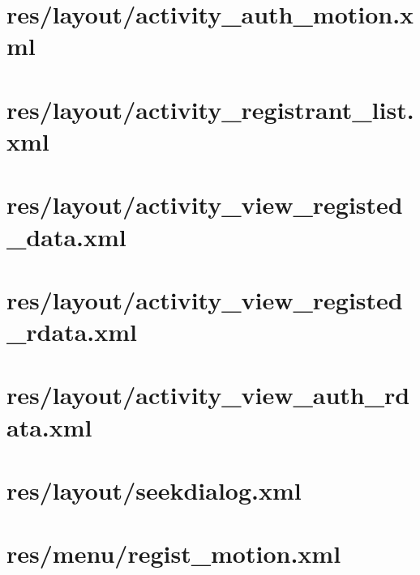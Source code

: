 \documentclass[12pt]{jreport}
\renewcommand{\slash}{/}
\begin{document}
    \section{res\slash layout\slash activity\_auth\_motion.xml}
    

    \section{res\slash layout\slash activity\_registrant\_list.xml}
    

    \section{res\slash layout\slash activity\_view\_registed\_data.xml}
    

    \section{res\slash layout\slash activity\_view\_registed\_rdata.xml}
    

    \section{res\slash layout\slash activity\_view\_auth\_rdata.xml}
    

    \section{res\slash layout\slash seekdialog.xml}
    

    \section{res\slash menu\slash regist\_motion.xml}
    
\end{document}
